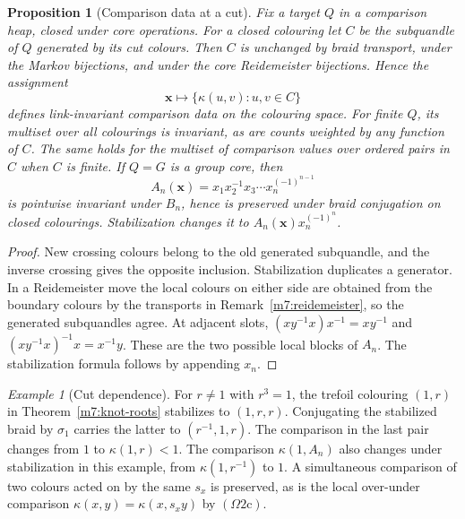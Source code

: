 \documentclass[11pt,reqno]{amsart}
\newtheorem{proposition}[theorem]{Proposition}
\theoremstyle{definition}
\theoremstyle{remark}
\newtheorem{example}[theorem]{Example}
\numberwithin{equation}{section}
\begin{document}
\begin{proposition}[Comparison data at a cut]\label{m7:comparison}
Fix a target $Q$ in a comparison heap, closed under core operations.
For a closed colouring let $C$ be the subquandle of $Q$ generated by
its cut colours. Then $C$ is unchanged by braid transport, under the
Markov bijections, and under the core Reidemeister bijections. Hence the
assignment
\[
 \mathbf x\longmapsto\{\kappa(u,v):u,v\in C\}
\]
defines link-invariant comparison data on the colouring space.
For finite $Q$, its multiset over all colourings is invariant, as are
counts weighted by any function of $C$. The same holds for the multiset
of comparison values over ordered pairs in $C$ when $C$ is finite.
If $Q=G$ is a group core, then
\[
 A_n(\mathbf x)=x_1x_2^{-1}x_3\cdots x_n^{(-1)^{n-1}}
\]
is pointwise invariant under $B_n$, hence is preserved under braid
conjugation on closed colourings. Stabilization changes it to
$A_n(\mathbf x)x_n^{(-1)^n}$.
\end{proposition}
\begin{proof}
New crossing colours belong to the old generated subquandle, and the
inverse crossing gives the opposite inclusion. Stabilization duplicates
a generator. In a Reidemeister move the local colours on either side
are obtained from the boundary colours by the transports in
Remark~\ref{m7:reidemeister}, so the generated subquandles agree.
At adjacent slots, $(xy^{-1}x)x^{-1}=xy^{-1}$ and
$(xy^{-1}x)^{-1}x=x^{-1}y$. These are the two possible local blocks
of $A_n$. The stabilization formula follows by appending $x_n$.
\end{proof}

\begin{example}[Cut dependence]\label{m7:cut}
For $r\ne1$ with $r^3=1$, the trefoil colouring $(1,r)$ in
Theorem~\ref{m7:knot-roots} stabilizes to $(1,r,r)$. Conjugating the
stabilized braid by $\sigma_1$ carries the latter to $(r^{-1},1,r)$.
The comparison in the last pair changes from $1$ to $\kappa(1,r)<1$.
The comparison $\kappa(1,A_n)$ also changes under stabilization in
this example, from $\kappa(1,r^{-1})$ to $1$. A simultaneous
comparison of two colours acted on by the same $s_x$ is preserved,
as is the local over-under comparison $\kappa(x,y)=\kappa(x,s_xy)$
by $(\Omega2\mathrm c)$.
\end{example}
\end{document}
